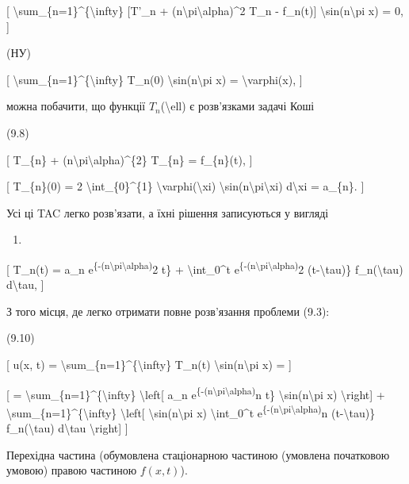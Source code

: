 \documentclass[
]{article}
\providecommand{\tightlist}{%
  \setlength{\itemsep}{0pt}\setlength{\parskip}{0pt}}
\begin{document}
{[} \textbackslash sum\_\{n=1\}\^{}\{\textbackslash infty\} {[}T'\_n +
(n\textbackslash pi\textbackslash alpha)\^{}2 T\_n - f\_n(t){]}
\textbackslash sin(n\textbackslash pi x) = 0, {]}

(НУ)

{[} \textbackslash sum\_\{n=1\}\^{}\{\textbackslash infty\} T\_n(0)
\textbackslash sin(n\textbackslash pi x) = \textbackslash varphi(x), {]}

можна побачити, що функції \(T_n\)(\textbackslash ell) є розв'язками
задачі Коші

(9.8)

{[} T\_\{n\} + (n\textbackslash pi\textbackslash alpha)\^{}\{2\}
T\_\{n\} = f\_\{n\}(t), {]}

{[} T\_\{n\}(0) = 2 \textbackslash int\_\{0\}\^{}\{1\}
\textbackslash varphi(\textbackslash xi)
\textbackslash sin(n\textbackslash pi\textbackslash xi)
d\textbackslash xi = a\_\{n\}. {]}

Усі ці TAC легко розв'язати, а їхні рішення записуються у вигляді

\begin{enumerate}
\def\labelenumi{(\arabic{enumi})}
\setcounter{enumi}{98}
\tightlist
\item
\end{enumerate}

{[} T\_n(t) = a\_n
e\textsuperscript{\{-(n\textbackslash pi\textbackslash alpha)}2 t\} +
\textbackslash int\_0\^{}t
e\textsuperscript{\{-(n\textbackslash pi\textbackslash alpha)}2
(t-\textbackslash tau)\} f\_n(\textbackslash tau) d\textbackslash tau,
{]}

З того місця, де легко отримати повне розв'язання проблеми (9.3):

(9.10)

{[} u(x, t) = \textbackslash sum\_\{n=1\}\^{}\{\textbackslash infty\}
T\_n(t) \textbackslash sin(n\textbackslash pi x) = {]}

{[} = \textbackslash sum\_\{n=1\}\^{}\{\textbackslash infty\}
\textbackslash left{[} a\_n
e\textsuperscript{\{-(n\textbackslash pi\textbackslash alpha)}n t\}
\textbackslash sin(n\textbackslash pi x) \textbackslash right{]} +
\textbackslash sum\_\{n=1\}\^{}\{\textbackslash infty\}
\textbackslash left{[} \textbackslash sin(n\textbackslash pi x)
\textbackslash int\_0\^{}t
e\textsuperscript{\{-(n\textbackslash pi\textbackslash alpha)}n
(t-\textbackslash tau)\} f\_n(\textbackslash tau) d\textbackslash tau
\textbackslash right{]} {]}

Перехідна частина (обумовлена стаціонарною частиною (умовлена початковою
умовою) правою частиною \(f(x, t)\)).
\end{document}
